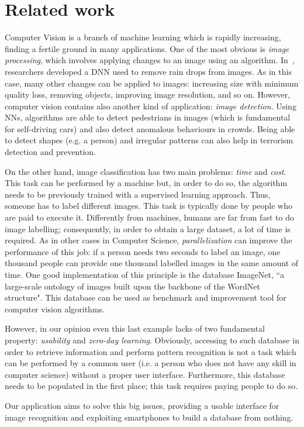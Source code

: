 \section{Related work}
\label{sec:related}

Computer Vision is a branch of machine learning which is rapidly increasing, finding a fertile ground in many applications. One of the most obvious is \textit{image processing}, which involves applying changes to an image using an algorithm. In~\cite{Rain}, researchers developed a DNN used to remove rain drops from images. As in this case, many other changes can be applied to images: increasing size with minimum quality loss, removing objects, improving image resolution, and so on. However, computer vision contains also another kind of application: \textit{image detection}. Using NNs, algorithms are able to detect pedestrians in images\cite{Pedestrian} (which is fundamental for self-driving cars) and also detect anomalous behaviours in crowds\cite{Crowd}. Being able to detect shapes (e.g. a person) and irregular patterns can also help in terrorism detection and prevention.

On the other hand, image classification has two main problems: \textit{time} and \textit{cost}. This task can be performed by a machine but, in order to do so, the algorithm needs to be previously trained with a supervised learning approach. Thus, someone has to label different images. This task is typically done by people who are paid to execute it. Differently from machines, humans are far from fast to do image labelling; consequently, in order to obtain a large dataset, a lot of time is required.
As in other cases in Computer Science, \textit{parallelization} can improve the performance of this job: if a person needs two seconds to label an image, one thousand people can provide one thousand labelled images in the same amount of time. One good implementation of this principle is the database ImageNet\cite{ImageNet2}, ``a large-scale ontology of images built upon the backbone of the WordNet structure"\cite{ImageNet1}. This database can be used as benchmark and improvement tool for computer vision algorithms.

However, in our opinion even this last example lacks of two fundamental property: \textit{usability} and \textit{zero-day learning}. Obviously, accessing to such database in order to retrieve information and perform pattern recognition is not a task which can be performed by a common user (i.e. a person who does not have any skill in computer science) without a proper user interface. Furthermore, this database needs to be populated in the first place; this task requires paying people to do so.

Our application aims to solve this big issues, providing a usable interface for image recognition and exploiting smartphones to build a database from nothing.
